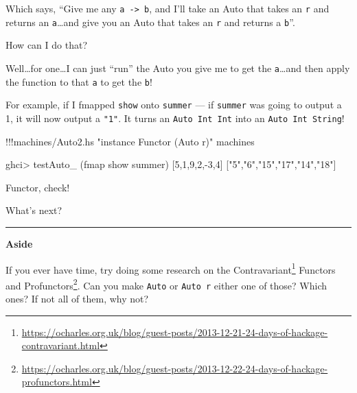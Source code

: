 \documentclass[]{article}
\newenvironment{Shaded}{}{}
\newcommand{\DecValTok}[1]{\textcolor[rgb]{0.25,0.63,0.44}{{#1}}}
\newcommand{\StringTok}[1]{\textcolor[rgb]{0.25,0.44,0.63}{{#1}}}
\newcommand{\FunctionTok}[1]{\textcolor[rgb]{0.02,0.16,0.49}{{#1}}}
\newcommand{\NormalTok}[1]{{#1}}
\renewcommand{\href}[2]{#2\footnote{\url{#1}}}
\begin{document}
Which says, ``Give me any \texttt{a\ -\textgreater{}\ b}, and I'll take
an Auto that takes an \texttt{r} and returns an \texttt{a}\ldots{}and
give you an Auto that takes an \texttt{r} and returns a \texttt{b}''.

How can I do that?

Well\ldots{}for one\ldots{}I can just ``run'' the Auto you give me to
get the \texttt{a}\ldots{}and then apply the function to that \texttt{a}
to get the \texttt{b}!

For example, if I fmapped \texttt{show} onto \texttt{summer} --- if
\texttt{summer} was going to output a 1, it will now output a
\texttt{"1"}. It turns an \texttt{Auto\ Int\ Int} into an
\texttt{Auto\ Int\ String}!

\begin{Shaded}
\begin{Highlighting}[]
\FunctionTok{!!!}\NormalTok{machines}\FunctionTok{/}\NormalTok{Auto2.hs }\StringTok{"instance Functor (Auto r)"} \NormalTok{machines}
\end{Highlighting}
\end{Shaded}

\begin{Shaded}
\begin{Highlighting}[]
\NormalTok{ghci}\FunctionTok{>} \NormalTok{testAuto_ (fmap show summer) [}\DecValTok{5}\NormalTok{,}\DecValTok{1}\NormalTok{,}\DecValTok{9}\NormalTok{,}\DecValTok{2}\NormalTok{,}\FunctionTok{-}\DecValTok{3}\NormalTok{,}\DecValTok{4}\NormalTok{]}
\NormalTok{[}\StringTok{"5"}\NormalTok{,}\StringTok{"6"}\NormalTok{,}\StringTok{"15"}\NormalTok{,}\StringTok{"17"}\NormalTok{,}\StringTok{"14"}\NormalTok{,}\StringTok{"18"}\NormalTok{]}
\end{Highlighting}
\end{Shaded}

Functor, check!

What's next?

\begin{center}\rule{0.5\linewidth}{\linethickness}\end{center}

\textbf{Aside}

If you ever have time, try doing some research on the
\href{https://ocharles.org.uk/blog/guest-posts/2013-12-21-24-days-of-hackage-contravariant.html}{Contravariant}
Functors and
\href{https://ocharles.org.uk/blog/guest-posts/2013-12-22-24-days-of-hackage-profunctors.html}{Profunctors}.
Can you make \texttt{Auto} or \texttt{Auto\ r} either one of those?
Which ones? If not all of them, why not?
\end{document}
